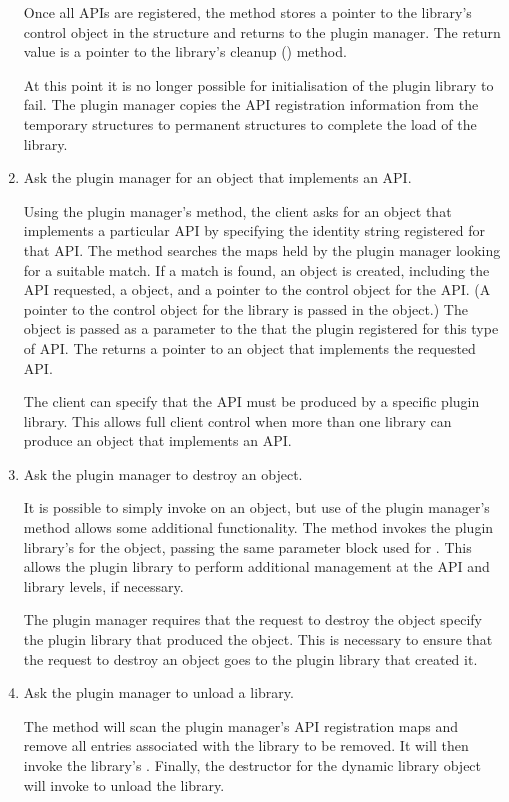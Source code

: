 \documentclass{article}
\begin{document}
\begin{enumerate}
  Once all APIs are registered, the  method stores a pointer
  to the library's control object in the  structure
  and returns to the plugin manager.
  The return value is a pointer to the library's cleanup ()
  method.

  At this point it is no longer possible for initialisation of the plugin
  library to fail.
  The plugin manager copies the API registration information from the
  temporary structures to permanent structures to complete the load of the
  library.

  \item
  Ask the plugin manager for an object that implements an API.

  Using the plugin manager's  method, the client asks for
  an object that implements a particular API by specifying the identity
  string registered for that API\@.
  The  method searches the maps held by the plugin manager
  looking for a suitable match.
  If a match is found, 
  an  object is created, including the API requested, a
   object, and a pointer to the control object for
  the API.
  (A pointer to the control object for the library is passed in the
   object.)
  The  object is passed as a parameter to the
   that the plugin registered for this type of API.
  The  returns a pointer to an object that implements the
  requested API.

  The client can specify that the API must be produced by a specific plugin
  library.
  This allows full client control when more than one library can produce an
  object that implements an API.

  \item
  Ask the plugin manager to destroy an object.

  It is possible to simply invoke  on an object, but use of the
  plugin manager's  method allows some additional
  functionality.
  The  method invokes the plugin library's
   for the object, passing the same 
  parameter block used for .
  This allows the plugin library to perform additional management at the API
  and library levels, if necessary.

  The plugin manager requires that the request to destroy the object specify
  the plugin library that produced the object.
  This is necessary to ensure that the
  request to destroy an object goes to the plugin library that created it.

  \item
  Ask the plugin manager to unload a library.

  The  method will scan the plugin manager's API
  registration maps and remove all entries associated with the library to be
  removed.
  It will then invoke the library's .
  Finally, the destructor for the dynamic library object will invoke
   to unload the library.
\end{enumerate}
\end{document}
